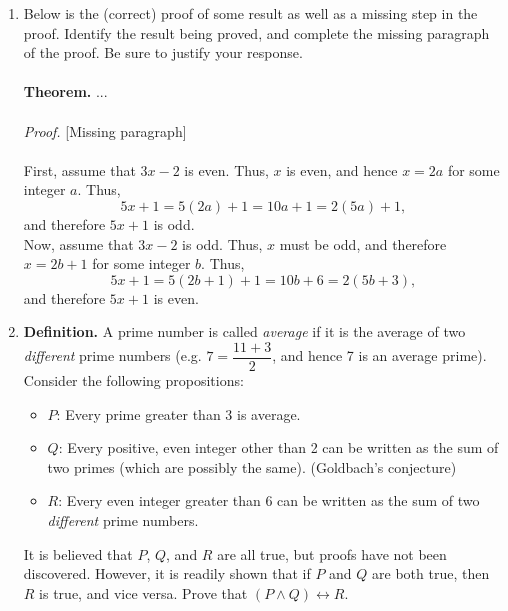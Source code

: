 \documentclass[12pt]{article}
\begin{document}
\begin{enumerate}
{\it Justification.} By reading through the proof, we can identify that the ultimate goal is to prove $xy + yz + xz$ must be even and to do so, it must be assumed that the variables used, $x, y,$ and $z$ are integer values. Lastly, we look at why "we may assume that $x$ and $y$ are even". If $xy$ were to equal an even integer, we could conclude that $x$ and $y$ might also be even integers as the product of two even integers is an even integer.

\emph{Proof.} Without loss of generality, we may assume that $x$ and $y$ are even. Then $x = 2a$ and $y = 2b$ for some integers $a$ and $b$. Thus,
\[xy + yz + xz = (2a)(2b) + (2b)z + (2a)z = 2(2ab + bz + az),\]
and therefore $xy + yz + xz$ is even. \qed





\item Below is the (correct) proof of some result as well as a missing step in the proof. Identify the result being proved, and complete the missing paragraph of the proof. Be sure to justify your response.\\\\
\textbf{Theorem.} ...\\\\
\emph{Proof.} [Missing paragraph]\\\\
First, assume that $3x - 2$ is even. Thus, $x$ is even, and hence $x = 2a$ for some integer $a$. Thus,
\[5x + 1 = 5 (2a) + 1 = 10a + 1 = 2(5a) + 1,\]
and therefore $5x + 1$ is odd.\\
Now, assume that $3x - 2$ is odd. Thus, $x$ must be odd, and therefore $x = 2b + 1$ for some integer $b$. Thus,
\[5x + 1 = 5(2b + 1) + 1 = 10 b + 6 = 2(5b + 3),\]
and therefore $5x + 1$ is even.



\item \textbf{Definition.} A prime number is called \emph{average} if it is the average of two \emph{different} prime numbers (e.g. $7 = \dfrac{11 + 3}{2}$, and hence 7 is an average prime). Consider the following propositions:
\begin{itemize}
\item[] $P$: Every prime greater than 3 is average.
\item[] $Q$: Every positive, even integer other than 2 can be written as the sum of two primes (which are possibly the same). (Goldbach's conjecture)
\item[] $R$: Every even integer greater than 6 can be written as the sum of two \emph{different} prime numbers. 
\end{itemize}
It is believed that $P$, $Q$, and $R$ are all true, but proofs have not been discovered. However, it is readily shown that if $P$ and $Q$ are both true, then $R$ is true, and vice versa. Prove that $(P \wedge Q) \leftrightarrow R$.





\end{enumerate}
\end{document}
